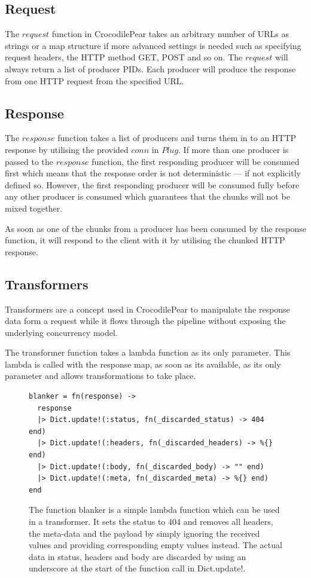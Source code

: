 \documentclass{cslthse-msc}
\begin{document}
\subsection{Request}
The $request$ function in CrocodilePear takes an arbitrary number of URLs as strings or a map structure if more advanced settings is needed such as specifying request headers, the HTTP method GET, POST and so on. The $request$ will always return a list of producer PIDs. Each producer will produce the response from one HTTP request from the specified URL.

\subsection{Response}
The $response$ function takes a list of producers and turns them in to an HTTP response by utilising the provided $conn$ in $Plug$. If more than one producer is passed to the $response$ function, the first responding producer will be consumed first which means that the response order is not deterministic --- if not explicitly defined so. However, the first responding producer will be consumed fully before any other producer is consumed which guarantees that the chunks will not be mixed together.

As soon as one of the chunks from a producer has been consumed by the response function, it will respond to the client with it by utilising the chunked HTTP response.

\subsection{Transformers}
Transformers are a concept used in CrocodilePear to manipulate the response data form a request while it flows through the pipeline without exposing the underlying concurrency model.

The transformer function takes a lambda function as its only parameter. This lambda is called with the response map, as soon as its available, as its only parameter and allows transformations to take place.

\begin{figure}[H]
  \centering
\begin{lstlisting}[breaklines=true,frame=single]
blanker = fn(response) ->
  response
  |> Dict.update!(:status, fn(_discarded_status) -> 404 end)
  |> Dict.update!(:headers, fn(_discarded_headers) -> %{} end)
  |> Dict.update!(:body, fn(_discarded_body) -> "" end)
  |> Dict.update!(:meta, fn(_discarded_meta) -> %{} end)
end
\end{lstlisting}
  \caption{The function blanker is a simple lambda function which can be used in a transformer. It sets the status to 404 and removes all headers, the meta-data and the payload by simply ignoring the received values and providing corresponding empty values instead. The actual data in status, headers and body are discarded by using an underscore at the start of the function call in Dict.update!.}
\end{figure}
\end{document}
